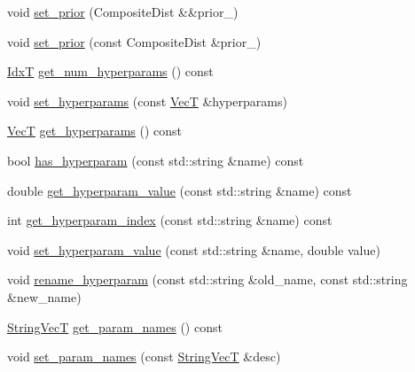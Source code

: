 \begin{DoxyCompactItemize}
\item 
void \hyperlink{classmappel_1_1PointEmitterModel_a8ee7d3d5b4c1ae4500f802170a958ed7}{set\+\_\+prior} (Composite\+Dist \&\&prior\+\_\+)
\item 
void \hyperlink{classmappel_1_1PointEmitterModel_acf37c5f28dc0c66197162b3408a6b815}{set\+\_\+prior} (const Composite\+Dist \&prior\+\_\+)
\item 
\hyperlink{namespacemappel_ab17ec0f30b61ece292439d7ece81d3a8}{IdxT} \hyperlink{classmappel_1_1PointEmitterModel_a442522cdaaa76be15b00a4f25110d7ec}{get\+\_\+num\+\_\+hyperparams} () const 
\item 
void \hyperlink{classmappel_1_1PointEmitterModel_ac603a33d83a32f5e4dd826399521a28b}{set\+\_\+hyperparams} (const \hyperlink{namespacemappel_a2225ad69f358daa3f4f99282a35b9a3a}{VecT} \&hyperparams)
\item 
\hyperlink{namespacemappel_a2225ad69f358daa3f4f99282a35b9a3a}{VecT} \hyperlink{classmappel_1_1PointEmitterModel_a4085ade54f4b039c647bc9bf7804e007}{get\+\_\+hyperparams} () const 
\item 
bool \hyperlink{classmappel_1_1PointEmitterModel_afba2b17a81a506b0acd41616c8604412}{has\+\_\+hyperparam} (const std\+::string \&name) const 
\item 
double \hyperlink{classmappel_1_1PointEmitterModel_a3282cc59d5c6010a51f671ba72997705}{get\+\_\+hyperparam\+\_\+value} (const std\+::string \&name) const 
\item 
int \hyperlink{classmappel_1_1PointEmitterModel_ae13aa99689266d870b659d1045d595f1}{get\+\_\+hyperparam\+\_\+index} (const std\+::string \&name) const 
\item 
void \hyperlink{classmappel_1_1PointEmitterModel_ade3e56cc00c43e9b7a521d8c4778d3b7}{set\+\_\+hyperparam\+\_\+value} (const std\+::string \&name, double value)
\item 
void \hyperlink{classmappel_1_1PointEmitterModel_a447c83f0769e6dea2bfad68d957287d0}{rename\+\_\+hyperparam} (const std\+::string \&old\+\_\+name, const std\+::string \&new\+\_\+name)
\item 
\hyperlink{namespacemappel_aae88cf18bccfbb789a6019bcfbbfca68}{String\+VecT} \hyperlink{classmappel_1_1PointEmitterModel_aa910d1137d808041c0601f2dd3db96f0}{get\+\_\+param\+\_\+names} () const 
\item 
void \hyperlink{classmappel_1_1PointEmitterModel_a2abccbca47fc60700d73244e6c4dbe30}{set\+\_\+param\+\_\+names} (const \hyperlink{namespacemappel_aae88cf18bccfbb789a6019bcfbbfca68}{String\+VecT} \&desc)
\item 

\end{DoxyCompactItemize}

